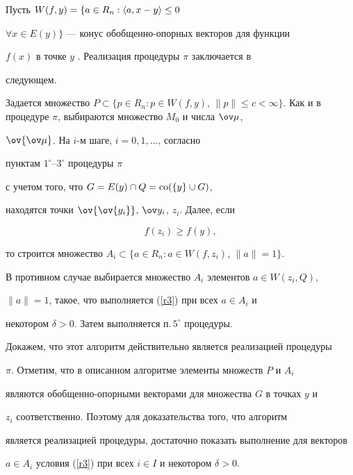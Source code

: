 Пусть $W(f,y)=\{a\in R_n: \langle a,x-y \rangle \le 0$


$\forall x\in E(y) \}$ --- конус обобщенно-опорных векторов для функции


$f(x)$ в точке $y$ \cite{b2}. Реализация процедуры $\pi$ заключается в


следующем.





Задается множество $P\subset \{p\in R_n: p\in W(f,y)$, $\|p\|\le c< \infty


\}$. Как и в процедуре $\pi$, выбираются множество $M_0$ и числа $\ov\mu$,


$\ov{\ov\mu}$. На $i$-м шаге, $i=0,1,\dotsc$, согласно


пунктам $1^\circ$--$3^\circ$ процедуры $\pi$


с учетом того, что $G=E(y)\cap Q=\operatorname{co}(\{y\}\cup G)$,


находятся точки $\ov{\ov{y_i}}$, $\ov y_i$, $z_i$. Далее, если




\begin{equation} \label{r10}


f(z_i)\ge f(y),


\end{equation}


%


то строится множество $A_i\subset \{a\in R_n: a\in W(f,z_i)$, $\|a\|=1 \}$.


В противном случае выбирается множество $A_i$ элементов $a\in W(z_i,Q)$,


$\|a\|=1$, такое, что выполняется (\ref{r3}) при всех $a\in A_i$ и


некотором $\delta>0$. Затем выполняется п.\,$5^\circ$ процедуры.





Докажем, что этот алгоритм действительно является реализацией процедуры


$\pi$. Отметим, что в описанном алгоритме элементы множеств $P$ и $A_i$


являются обобщенно-опорными векторами для множества $G$ в точках $y$ и


$z_i$ соответственно. Поэтому для доказательства того, что алгоритм


является реализацией процедуры, достаточно показать выполнение для векторов


$a\in A_i$ условия (\ref{r3}) при всех $i\in I$ и некотором $\delta>0$.





